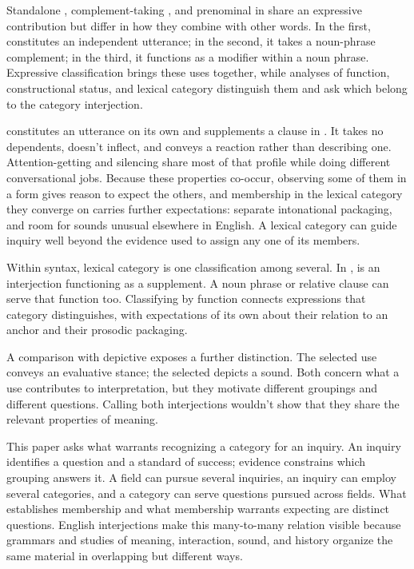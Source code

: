 \documentclass[12pt]{article}
\begin{document}
Standalone , complement-taking ,
and prenominal  in  share an expressive
contribution but differ in how they combine with other words. In the first,
 constitutes an independent utterance; in the second, it
takes a noun-phrase complement; in the third, it functions as a modifier
within a noun phrase. Expressive classification brings these uses together,
while analyses of function, constructional status, and lexical category
distinguish them and ask
which belong to the category interjection.

 constitutes an utterance on its own and supplements a
clause in . It takes no dependents, doesn't
inflect, and conveys a reaction rather than describing one.
Attention-getting  and silencing  share most of
that profile while doing different conversational jobs. Because these
properties co-occur, observing some of them in a form gives reason to
expect the others, and membership in the lexical category they converge on
carries further expectations: separate intonational packaging, and room for
sounds unusual elsewhere in English. A lexical category can guide inquiry
well beyond the evidence used to assign any one of its members.

Within syntax, lexical category is one classification among several. In
,  is an
interjection functioning as a supplement. A noun phrase or relative
clause can serve that function too. Classifying by function connects
expressions that category distinguishes, with expectations of its own
about their relation to an anchor and their prosodic packaging.

A comparison with depictive  exposes a further distinction.
The selected  use conveys an evaluative stance; the selected
 depicts a sound. Both concern what a use contributes to
interpretation, but they motivate different groupings and different
questions. Calling both interjections wouldn't show that they share the
relevant properties of meaning.

This paper asks what warrants recognizing a category for an inquiry.
An inquiry identifies a question and a standard of success; evidence
constrains which grouping answers it. A field can pursue several inquiries,
an inquiry can employ several categories, and a category can serve questions
pursued across fields. What establishes membership and what membership
warrants expecting are distinct questions. English interjections make this
many-to-many relation visible because grammars and studies of meaning,
interaction, sound, and history organize the same material in overlapping
but different ways.
\end{document}
